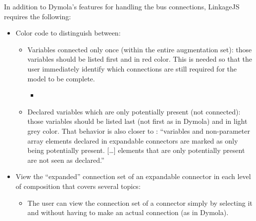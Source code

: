 \documentclass[letterpaper,10pt, openany,english]{sphinxmanual}
\begin{document}
In addition to Dymola’s features for handling the bus connections, LinkageJS requires the following:
\begin{itemize}
\item {} 
Color code to distinguish between:
\begin{itemize}
\item {} 
Variables connected only once (within the entire augmentation set): those variables should be listed first and in red color. This is needed so that the user immediately identify which connections are still required for the model to be complete.
\begin{itemize}
\item {} 

\end{itemize}

\item {} 
Declared variables which are only potentially present (not connected): those variables should be listed last (not first as in Dymola) and in light grey color. That behavior is also closer to  : “variables and non-parameter array elements declared in expandable connectors are marked as only being potentially present. {[}…{]} elements that are only potentially present are not seen as declared.”

\end{itemize}

\item {} 
View the “expanded” connection set of an expandable connector in each level of composition \textendash{} that covers several topics:
\begin{itemize}
\item {} 
The user can view the connection set of a connector simply by selecting it and without having to make an actual connection (as in Dymola).


\end{itemize}
\end{itemize}
\end{document}
